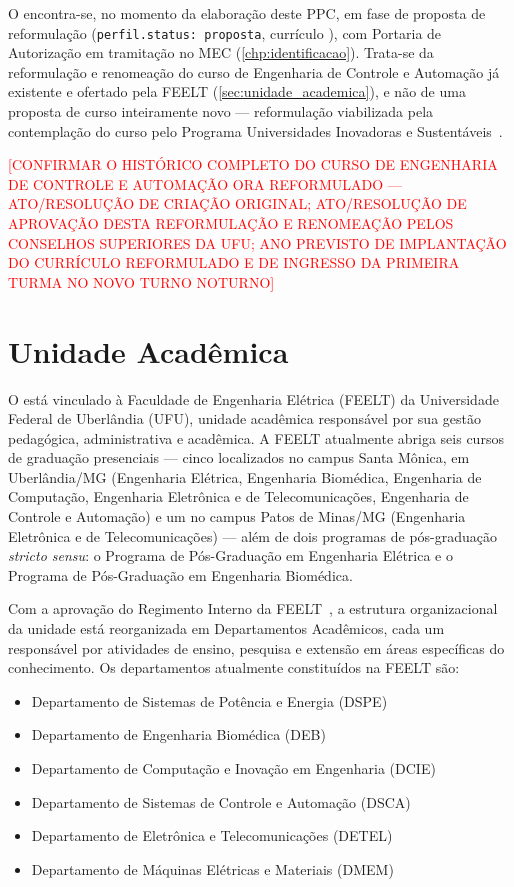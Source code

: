 O \ppccurso encontra-se, no momento da elaboração deste PPC, em fase de proposta de reformulação (\texttt{perfil.status: proposta}, currículo \ppcversao), com Portaria de Autorização em tramitação no MEC (\autoref{chp:identificacao}). Trata-se da reformulação e renomeação do curso de Engenharia de Controle e Automação já existente e ofertado pela FEELT (\autoref{sec:unidade_academica}), e não de uma proposta de curso inteiramente novo — reformulação viabilizada pela contemplação do curso pelo Programa Universidades Inovadoras e Sustentáveis~\cite{programa_universidades_inovadoras_sustentaveis}.

\textcolor{red}{[CONFIRMAR O HISTÓRICO COMPLETO DO CURSO DE ENGENHARIA DE CONTROLE E AUTOMAÇÃO ORA REFORMULADO — ATO/RESOLUÇÃO DE CRIAÇÃO ORIGINAL; ATO/RESOLUÇÃO DE APROVAÇÃO DESTA REFORMULAÇÃO E RENOMEAÇÃO PELOS CONSELHOS SUPERIORES DA UFU; ANO PREVISTO DE IMPLANTAÇÃO DO CURRÍCULO REFORMULADO E DE INGRESSO DA PRIMEIRA TURMA NO NOVO TURNO NOTURNO]}

\section{Unidade Acadêmica}
\label{sec:unidade_academica}

O \ppccurso está vinculado à Faculdade de Engenharia Elétrica (FEELT) da Universidade Federal de Uberlândia (UFU), unidade acadêmica responsável por sua gestão pedagógica, administrativa e acadêmica. A FEELT atualmente abriga seis cursos de graduação presenciais — cinco localizados no campus Santa Mônica, em Uberlândia/MG (Engenharia Elétrica, Engenharia Biomédica, Engenharia de Computação, Engenharia Eletrônica e de Telecomunicações, Engenharia de Controle e Automação) e um no campus Patos de Minas/MG (Engenharia Eletrônica e de Telecomunicações) — além de dois programas de pós-graduação \textit{stricto sensu}: o Programa de Pós-Graduação em Engenharia Elétrica e o Programa de Pós-Graduação em Engenharia Biomédica.

Com a aprovação do Regimento Interno da FEELT~\cite{ufu_feelt_regimento_2023}, a estrutura organizacional da unidade está reorganizada em Departamentos Acadêmicos, cada um responsável por atividades de ensino, pesquisa e extensão em áreas específicas do conhecimento. Os departamentos atualmente constituídos na FEELT são:

\begin{itemize}
    \item Departamento de Sistemas de Potência e Energia (DSPE)
    \item Departamento de Engenharia Biomédica (DEB)
    \item Departamento de Computação e Inovação em Engenharia (DCIE)
    \item Departamento de Sistemas de Controle e Automação (DSCA)
    \item Departamento de Eletrônica e Telecomunicações (DETEL)
    \item Departamento de Máquinas Elétricas e Materiais (DMEM)
\end{itemize}

